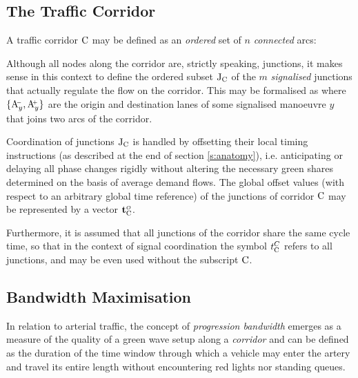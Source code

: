 \subsection{The Traffic Corridor}

A traffic corridor $\mathrm{C}$ may be defined as an \emph{ordered} set of $n$ \emph{connected} arcs:

Although all nodes along the corridor are, strictly speaking, junctions, it makes sense in this context to define the ordered subset $\mathrm{J}_{\mathrm{C}}$ of the $m$ \emph{signalised} junctions that actually regulate the flow on the corridor.
This may be formalised as
where $\{\mathrm{A}_{y}^{\scriptscriptstyle{\hspace{-2pt}-}}, \mathrm{A}_{y}^{\scriptscriptstyle{\hspace{-2pt}+}}\}$ are the origin and destination lanes of some signalised manoeuvre $y$ that joins two arcs of the corridor.

Coordination of junctions $\mathrm{J}_{\mathrm{C}}$ is handled by offsetting their local timing instructions (as described at the end of section \ref{s:anatomy}), i.e. anticipating or delaying all phase changes rigidly without altering the necessary green shares determined on the basis of average demand flows.
The global offset values (with respect to an arbitrary global time reference) of the junctions of corridor $\mathrm{C}$ may be represented by a vector $\mathbf{t}_{\mathrm{C}}^{\scriptscriptstyle{O}}$.

Furthermore, it is assumed that all junctions of the corridor share the same cycle time, so that in the context of signal coordination the symbol $t_{\mathrm{C}}^C$ refers to all junctions, and may be even used without the subscript $\mathrm{C}$.


\subsection{Bandwidth Maximisation} \label{s:bandmax}
In relation to arterial traffic, the concept of \emph{progression bandwidth} emerges as a measure of the quality of a green wave setup along a \emph{corridor} and can be defined as the duration of the time window through which a vehicle may enter the artery and travel its entire length without encountering red lights nor standing queues.


